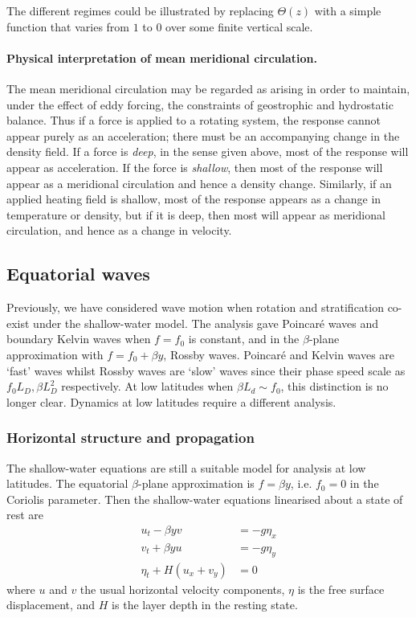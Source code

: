 \documentclass{jknotes}
\begin{document}
The different regimes could be illustrated by replacing $\Theta(z)$ with a
simple function that varies from $1$ to $0$ over some finite vertical scale. 

\paragraph{Physical interpretation of mean meridional circulation.} The mean
meridional circulation may be regarded as arising in order to maintain, under
the effect of eddy forcing, the constraints of geostrophic and hydrostatic
balance. Thus if a force is applied to a rotating system, the response cannot
appear purely as an acceleration; there must be an accompanying change in the
density field. If a force is \emph{deep}, in the sense given above, most of
the response will appear as acceleration. If the force is \emph{shallow}, then
most of the response will appear as a meridional circulation and hence a
density change. Similarly, if an applied heating field is shallow, most of the
response appears as a change in temperature or density, but if it is deep,
then most will appear as meridional circulation, and hence as a change in
velocity. 

\subsection{Equatorial waves}
Previously, we have considered wave motion when rotation and stratification
co-exist under the shallow-water model. The analysis gave Poincar\'{e} waves
and boundary Kelvin waves when $f = f_0$ is constant, and in the $\beta$-plane
approximation with $f = f_0 + \beta y$, Rossby waves. Poincar\'{e} and Kelvin
waves are `fast' waves whilst Rossby waves are `slow' waves since their
phase speed scale as $f_0 L_D, \beta L_D^2$ respectively. At low latitudes
when $\beta L_d \sim f_0$, this distinction is no longer clear. Dynamics at
low latitudes require a different analysis.

\subsubsection{Horizontal structure and propagation}
\label{ss:lategnfunc}
The shallow-water equations are still a suitable model for analysis at low
latitudes. The equatorial $\beta$-plane approximation is $f = \beta y$, i.e.
$f_0 = 0$ in the Coriolis parameter. Then the shallow-water equations
linearised about a state of rest are
\begin{align}
	u_t - \beta y v &= - g \eta_x \label{eq:sweq1} \\
	v_t + \beta y u &= - g \eta_y \label{eq:sweq2} \\
	\eta_t + H(u_x + v_y) &= 0\label{eq:sweq3}
\end{align}
where $u$ and $v$ the usual horizontal velocity components, $\eta$ is the free
surface displacement, and $H$ is the layer depth in the resting state.
\end{document}

